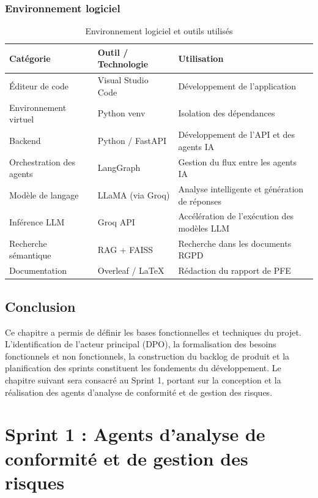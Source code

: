 \documentclass[12pt,a4paper]{report}
\begin{document}
\subsection{Environnement logiciel}

\begin{table}[H]
\centering
\caption{Environnement logiciel et outils utilisés}
\label{tab:env_logiciel}
\begin{tabularx}{\textwidth}{|l|X|X|}
\hline
\textbf{Catégorie} & \textbf{Outil / Technologie} & \textbf{Utilisation} \\
\hline
Éditeur de code & Visual Studio Code & Développement de l'application \\
\hline
Environnement virtuel & Python venv & Isolation des dépendances \\
\hline
Backend & Python / FastAPI & Développement de l'API et des agents IA \\
\hline
Orchestration des agents & LangGraph & Gestion du flux entre les agents IA \\
\hline
Modèle de langage & LLaMA (via Groq) & Analyse intelligente et génération de réponses \\
\hline
Inférence LLM & Groq API & Accélération de l'exécution des modèles LLM \\
\hline
Recherche sémantique & RAG + FAISS & Recherche dans les documents RGPD \\
\hline
Documentation & Overleaf / LaTeX & Rédaction du rapport de PFE \\
\hline
\end{tabularx}
\end{table}

\section{Conclusion}

Ce chapitre a permis de définir les bases fonctionnelles et techniques du projet. L'identification de l'acteur principal (DPO), la formalisation des besoins fonctionnels et non fonctionnels, la construction du backlog de produit et la planification des sprints constituent les fondements du développement. Le chapitre suivant sera consacré au Sprint 1, portant sur la conception et la réalisation des agents d'analyse de conformité et de gestion des risques.

\chapter{Sprint 1 : Agents d'analyse de conformité et de gestion des risques}
\end{document}
